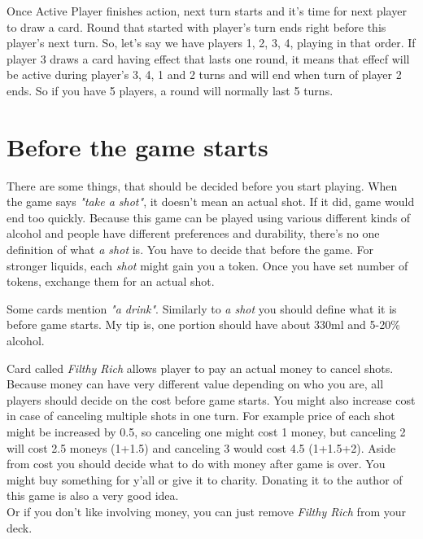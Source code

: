 \documentclass[notitlepage]{article}
\begin{document}
Once Active Player finishes action, next turn starts and it's time for next player to draw a card. Round that started with player's turn ends right before this player's next turn. So, let's say we have players 1, 2, 3, 4, playing in that order. If player 3 draws a card having effect that lasts one round, it means that effecf will be active during player's 3, 4, 1 and 2 turns and will end when turn of player 2 ends. So if you have 5 players, a round will normally last 5 turns.

\section{Before the game starts}
There are some things, that should be decided before you start playing. When the game says \textsl{"take a shot"}, it doesn't mean an actual shot. If it did, game would end too quickly. Because this game can be played using various different kinds of alcohol and people have different preferences and durability, there's no one definition of what \textsl{a shot} is. You have to decide that before the game. For stronger liquids, each \textsl{shot} might gain you a token. Once you have set number of tokens, exchange them for an actual shot. %

Some cards mention \textsl{"a drink"}. Similarly to \textsl{a shot} you should define what it is before game starts. My tip is, one portion should have about 330ml and 5-20\% alcohol.

Card called \textsl{Filthy Rich} allows player to pay an actual money to cancel shots. Because money can have very different value depending on who you are, all players should decide on the cost before game starts. You might also increase cost in case of canceling multiple shots in one turn. For example price of each shot might be increased by 0.5, so canceling one might cost 1 money, but canceling 2 will cost 2.5 moneys (1+1.5) and canceling 3 would cost 4.5 (1+1.5+2).\newline
Aside from cost you should decide what to do with money after game is over. You might buy something for y'all or give it to charity. Donating it to the author of this game is also a very good idea. \\
Or if you don't like involving money, you can just remove \textsl{Filthy Rich} from your deck.
\end{document}
